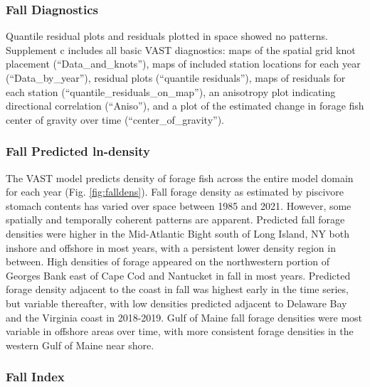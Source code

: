 \documentclass[
]{article}
\begin{document}
\hypertarget{fall-diagnostics}{%
\subsubsection{Fall Diagnostics}\label{fall-diagnostics}}

Quantile residual plots and residuals plotted in space showed no patterns. Supplement c includes all basic VAST diagnostics: maps of the spatial grid knot placement (``Data\_and\_knots''), maps of included station locations for each year (``Data\_by\_year''), residual plots (``quantile residuals''), maps of residuals for each station (``quantile\_residuals\_on\_map''), an anisotropy plot indicating directional correlation (``Aniso''), and a plot of the estimated change in forage fish center of gravity over time (``center\_of\_gravity'').

\hypertarget{fall-predicted-ln-density}{%
\subsubsection{Fall Predicted ln-density}\label{fall-predicted-ln-density}}

The VAST model predicts density of forage fish across the entire model domain for each year (Fig. \ref{fig:falldens}). Fall forage density as estimated by piscivore stomach contents has varied over space between 1985 and 2021. However, some spatially and temporally coherent patterns are apparent. Predicted fall forage densities were higher in the Mid-Atlantic Bight south of Long Island, NY both inshore and offshore in most years, with a persistent lower density region in between. High densities of forage appeared on the northwestern portion of Georges Bank east of Cape Cod and Nantucket in fall in most years. Predicted forage density adjacent to the coast in fall was highest early in the time series, but variable thereafter, with low densities predicted adjacent to Delaware Bay and the Virginia coast in 2018-2019. Gulf of Maine fall forage densities were most variable in offshore areas over time, with more consistent forage densities in the western Gulf of Maine near shore.

\hypertarget{fall-index}{%
\subsubsection{Fall Index}\label{fall-index}}
\end{document}
